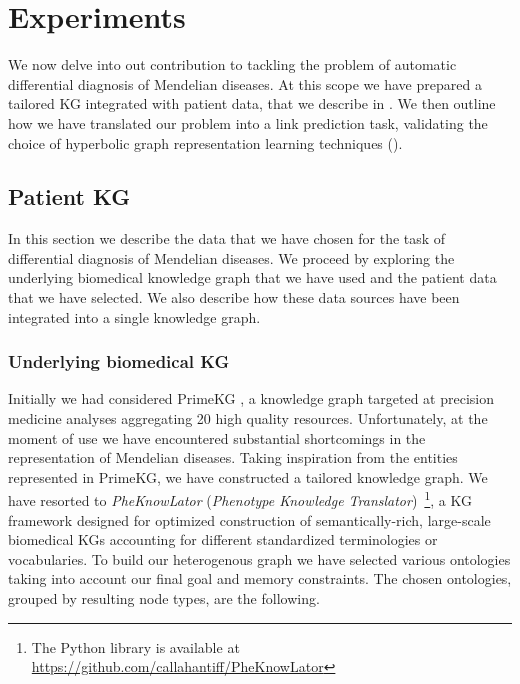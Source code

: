 \chapter{Experiments}
We now delve into out contribution to tackling the problem of automatic differential diagnosis of Mendelian diseases. At this scope we have prepared a tailored KG integrated with patient data, that we describe in . We then outline how we have translated our problem into a link prediction task, validating the choice of hyperbolic graph representation learning techniques (). 

\section{Patient KG}\label{sec:patientKG}
In this section we describe the data that we have chosen for the task of differential diagnosis of Mendelian diseases. We proceed by exploring the underlying biomedical knowledge graph that we have used and the patient data that we have selected. We also describe how these data sources have been integrated into a single knowledge graph.

\subsection{Underlying biomedical KG}\label{sec:underlyingKG}
Initially we had considered PrimeKG \cite{chandak2023PrimeKG}, a knowledge graph targeted at precision medicine analyses aggregating 20 high quality resources. Unfortunately, at the moment of use we have encountered substantial shortcomings in the representation of Mendelian diseases. Taking inspiration from the entities represented in PrimeKG, we have constructed a tailored knowledge graph. We have resorted to \emph{PheKnowLator} (\emph{Phenotype Knowledge Translator})~\cite{callahan2020PheKnowlator}\footnote{The Python library is available at \url{https://github.com/callahantiff/PheKnowLator}}, a KG framework designed for optimized construction of semantically-rich, large-scale biomedical KGs accounting for different standardized terminologies or vocabularies. To build our heterogenous graph we have selected various ontologies taking into account our final goal and memory constraints. The chosen ontologies, grouped by resulting node types, are the following.


